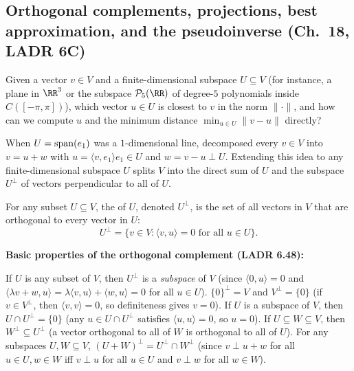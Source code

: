 \documentclass[10pt]{scrartcl}
\newcommand{\ip}[2]{\langle #1,#2\rangle}
\begin{document}
\subsection{Orthogonal complements, projections, best approximation, and the pseudoinverse (Ch.~18, LADR 6C)}

\begin{qbox}
  Given a vector $v\in V$ and a finite-dimensional subspace $U\subseteq V$ (for instance, a plane in $\RR^3$ or the subspace $\PP_5(\RR)$ of degree-$5$ polynomials inside $C([-\pi,\pi])$), which vector $u\in U$ is closest to $v$ in the norm $\|\cdot\|$, and how can we compute $u$ and the minimum distance $\min_{u\in U}\|v-u\|$ directly?
\end{qbox}

When $U=\operatorname{span}(e_1)$ was a $1$-dimensional line,  decomposed every $v\in V$ into $v=u+w$ with $u=\ip v{e_1}e_1\in U$ and $w=v-u\perp U$. Extending this idea to any finite-dimensional subspace $U$ splits $V$ into the direct sum of $U$ and the subspace $U^\perp$ of vectors perpendicular to all of $U$.

\begin{definition*}
  For any subset $U\subseteq V$, the  of $U$, denoted $U^\perp$, is the set of all vectors in $V$ that are orthogonal to every vector in $U$:
  \[
    U^\perp = \{v\in V : \ip vu = 0 \text{ for all }u\in U\}.
  \]
\end{definition*}

\begin{itemize}
  \ii \textbf{Basic properties of the orthogonal complement (LADR 6.48):}
  \begin{enumerate}[(a)]
    \ii If $U$ is any subset of $V$, then $U^\perp$ is a \emph{subspace} of $V$ (since $\ip 0u=0$ and $\ip{\lambda v+w}{u}=\lambda\ip vu+\ip wu=0$ for all $u\in U$).
    \ii $\{0\}^\perp = V$ and $V^\perp = \{0\}$ (if $v\in V^\perp$, then $\ip vv=0$, so definiteness gives $v=0$).
    \ii If $U$ is a subspace of $V$, then $U\cap U^\perp = \{0\}$ (any $u\in U\cap U^\perp$ satisfies $\ip uu=0$, so $u=0$).
    \ii If $U\subseteq W\subseteq V$, then $W^\perp\subseteq U^\perp$ (a vector orthogonal to all of $W$ is orthogonal to all of $U$).
    \ii For any subspaces $U,W\subseteq V$, $(U+W)^\perp = U^\perp\cap W^\perp$ (since $v\perp u+w$ for all $u\in U,w\in W$ iff $v\perp u$ for all $u\in U$ and $v\perp w$ for all $w\in W$).
  \end{enumerate}
\end{itemize}
\end{document}
